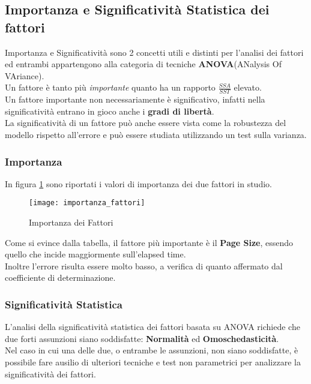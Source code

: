 \subsection{Importanza e Significatività Statistica dei fattori}
Importanza e Significatività sono 2 concetti utili e distinti per l'analisi dei
fattori ed entrambi appartengono alla categoria di tecniche
\textbf{ANOVA}(ANalysis Of VAriance).\\
Un fattore è tanto più \textit{importante} quanto ha un rapporto $\frac{SSA}{SST}$
elevato.\\
Un fattore importante non necessariamente è significativo, infatti nella significatività
entrano in gioco anche i \textbf{gradi di libertà}.\\
La significatività di un fattore può anche essere vista come la robustezza del
modello rispetto all'errore e può essere studiata utilizzando un test sulla
varianza.\\

\subsubsection{Importanza}
In figura \ref{webserver_importanza_fattori} sono riportati i valori di importanza dei due
fattori in studio.

\begin{figure}[!htbp]
  \centering
  \texttt{[image: importanza\_fattori]}
  \caption{Importanza dei Fattori}
  \label{webserver_importanza_fattori}
\end{figure}

Come si evince dalla tabella, il fattore più importante è il \textbf{Page Size},
essendo quello che incide maggiormente sull'elapsed time.\\
Inoltre l'errore risulta essere molto basso, a verifica di quanto affermato dal
coefficiente di determinazione.\\

\clearpage

\subsubsection{Significatività Statistica}
L'analisi della significatività statistica dei fattori basata su ANOVA richiede
che due forti assunzioni siano soddisfatte: \textbf{Normalità} ed
\textbf{Omoschedasticità}.\\
Nel caso in cui una delle due, o entrambe le assunzioni, non siano soddisfatte, è
possibile fare ausilio di ulteriori tecniche e test non parametrici per analizzare
la significatività dei fattori.\\

